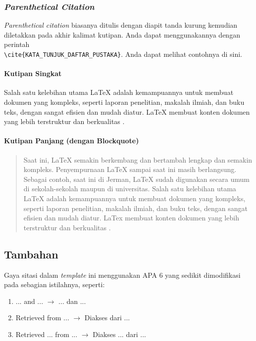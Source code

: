 \subsubsection{\textit{Parenthetical Citation}}

\textit{Parenthetical citation} biasanya ditulis dengan diapit tanda kurung kemudian diletakkan pada akhir kalimat kutipan. Anda dapat menggunakannya dengan perintah \\ \verb|\cite{KATA_TUNJUK_DAFTAR_PUSTAKA}|. Anda dapat melihat contohnya di sini.

\paragraph{Kutipan Singkat}

Salah satu kelebihan utama LaTeX adalah kemampuannya untuk membuat dokumen yang kompleks, seperti laporan penelitian, makalah ilmiah, dan buku teks, dengan sangat efisien dan mudah diatur. LaTeX membuat konten dokumen yang lebih terstruktur dan berkualitas \cite{fitriani-2024:pelatihan-latex}.

\paragraph{Kutipan Panjang (dengan Blockquote)}

\begin{quote}
    Saat ini, LaTeX semakin berkembang dan bertambah lengkap dan semakin kompleks. Penyempurnaan LaTeX sampai saat ini masih berlangsung. Sebagai contoh, saat ini di Jerman, LaTeX sudah digunakan secara umum di sekolah-sekolah maupun di universitas. Salah satu kelebihan utama LaTeX adalah kemampuannya untuk membuat dokumen yang kompleks, seperti laporan penelitian, makalah ilmiah, dan buku teks, dengan sangat efisien dan mudah diatur. LaTex membuat konten dokumen yang lebih terstruktur dan berkualitas \cite{fitriani-2024:pelatihan-latex}.
\end{quote}

\subsection{Tambahan}

Gaya sitasi dalam \textit{template} ini menggunakan APA 6 yang sedikit dimodifikasi pada sebagian istilahnya, seperti:

\begin{enumerate}[nosep]
    \item ... and ... $\longrightarrow$ ... dan ...
    \item Retrieved from ... $\longrightarrow$ Diakses dari ...
    \item Retrieved ... from ... $\longrightarrow$ Diakses ... dari ...
\end{enumerate}


